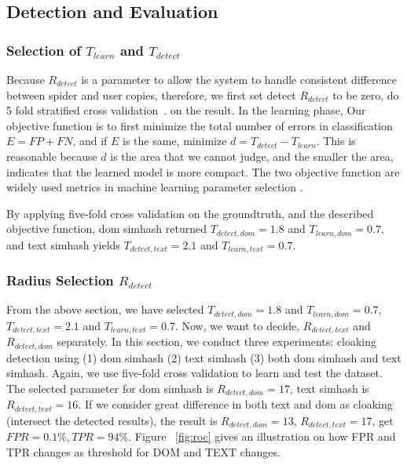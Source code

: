 

\subsection{Detection and Evaluation}

\subsubsection{Selection of $T_{learn}$ and $T_{detect}$}
Because $R_{detect}$ is a parameter to allow the system to handle consistent
difference between spider and user copies, therefore, we first set detect
$R_{detect}$ to be zero, do 5 fold stratified cross validation~\cite{scikit-learn}.
on the result. 
In the learning phase,
Our objective function is to first minimize the total number of errors in classification $E = FP + FN$, and
if $E$ is the same, minimize $d = T_{detect} - T_{learn}$.
This is reasonable because $d$ is the area that we cannot judge, and the smaller
the area, indicates that the learned model is more compact. The two objective
function are widely used metrics in machine
learning parameter selection .

By applying five-fold cross validation on the groundtruth, and the described
objective function, dom simhash returned 
$T_{detect, dom} = 1.8$ and $T_{learn, dom} = 0.7$, and text simhash yields
$T_{detect, text} = 2.1$ and $T_{learn, text} = 0.7$.
%
\subsubsection{Radius Selection $R_{detect}$}
From the above section, we have selected $T_{detect, dom} = 1.8$ and $T_{learn, dom} = 0.7$,
$T_{detect, text} = 2.1$ and $T_{learn, text} = 0.7$. Now, we want to decide,
$R_{detect, text}$ and $R_{detect, dom}$ separately. In this section, we conduct
three experiments: cloaking detection using (1) dom simhash (2) text simhash (3)
both dom simhash and text simhash.
Again, we use five-fold cross validation to learn and test the dataset. The
selected parameter for dom simhash is $R_{detect, dom} = 17$, text simhash is
$R_{detect, text} = 16$. If we consider great difference in both text and dom as
cloaking (intersect the detected results), the result is $R_{detect, dom} = 13$,
$R_{detect, text} = 17$, get $FPR = 0.1\%, TPR = 94\%$.
Figure ~\autoref{fig:roc} gives an illustration on how FPR and TPR changes as
threshold for DOM and TEXT changes.

